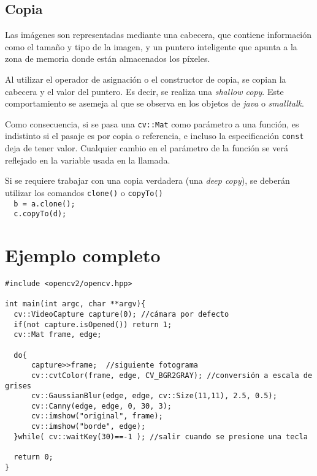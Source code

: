 \documentclass[11pt,a4paper,onecolumn]
{article}
\newcommand{\tc}[1]{\texttt{#1}}
\begin{document}
		\subsection{Copia}
			Las imágenes son representadas mediante una cabecera, que contiene información como el tamaño y tipo de la imagen, y un puntero inteligente que apunta a la zona de memoria donde están almacenados los píxeles.

			Al utilizar el operador de asignación o el constructor de copia, se copian la cabecera y el valor del puntero. Es decir, se realiza una \emph{shallow copy}. Este comportamiento se asemeja al que se observa en los objetos de \emph{java} o \emph{smalltalk}.

			Como consecuencia, si se pasa una \tc{cv::Mat} como parámetro a una función, es indistinto si el pasaje es por copia o referencia, e incluso la especificación \tc{const} deja de tener valor.
			Cualquier cambio en el parámetro de la función se verá reflejado en la variable usada en la llamada.

			Si se requiere trabajar con una copia verdadera (una \emph{deep copy}), se deberán utilizar los comandos \tc{clone()} o \tc{copyTo()}\\
			\verb|  b = a.clone();|\\
			\verb|  c.copyTo(d);|

	\section{Ejemplo completo}
\begin{verbatim}
#include <opencv2/opencv.hpp>

int main(int argc, char **argv){
  cv::VideoCapture capture(0); //cámara por defecto
  if(not capture.isOpened()) return 1;
  cv::Mat frame, edge;

  do{
      capture>>frame;  //siguiente fotograma
      cv::cvtColor(frame, edge, CV_BGR2GRAY); //conversión a escala de grises
      cv::GaussianBlur(edge, edge, cv::Size(11,11), 2.5, 0.5);
      cv::Canny(edge, edge, 0, 30, 3);
      cv::imshow("original", frame);
      cv::imshow("borde", edge);
  }while( cv::waitKey(30)==-1 ); //salir cuando se presione una tecla

  return 0;
}


\end{verbatim}
\end{document}
